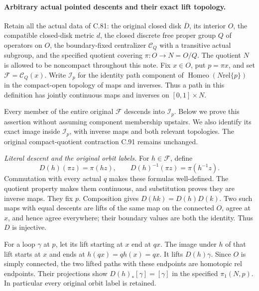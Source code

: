 \paragraph{Arbitrary actual pointed descents and their exact lift topology.}
Retain all the actual data of C.81: the original closed disk
$\overline D$, its interior $O$, the compatible closed-disk metric $d$,
the closed discrete free proper group $Q$ of operators on $O$,
the boundary-fixed centralizer $\mathscr C_Q$ with a transitive actual
subgroup, and the specified quotient covering $\pi:O\to N=O/Q$.
The quotient $N$ is allowed to be noncompact throughout this note.
Fix $x\in O$, put $p=\pi x$, and set $\mathscr F=\mathscr C_Q(x)$.
Write $\mathscr I_p$ for the identity path component of
$\operatorname{Homeo}(N\mathbin{\mathrm{rel}}\{p\})$ in the compact-open
topology of maps and inverses. Thus a path in this definition has
jointly continuous maps and inverses on $[0,1]\times N$.

Every member of the entire original $\mathscr F$ descends into
$\mathscr I_p$. Below we prove this assertion without assuming
component membership upstairs. We also identify its exact image
inside $\mathscr I_p$, with inverse maps and both relevant topologies.
The original compact-quotient contraction C.91 remains unchanged.

\emph{Literal descent and the original orbit labels.}
For $h\in\mathscr F$, define
\[
 D(h)(\pi z)=\pi(hz),\qquad
 D(h)^{-1}(\pi z)=\pi(h^{-1}z).
                                                               \tag{GPD.1}
\]
Commutation with every actual $q$ makes these formulas well-defined.
The quotient property makes them continuous, and substitution proves
they are inverse maps. They fix $p$. Composition gives
$D(hk)=D(h)D(k)$. Two such maps with equal descents are lifts of the
same map on the connected $O$, agree at $x$, and hence agree everywhere;
their boundary values are both the identity. Thus $D$ is injective.

For a loop $\gamma$ at $p$, let its lift starting at $x$ end at $qx$.
The image under $h$ of that lift starts at $x$ and ends at
$h(qx)=qh(x)=qx$. It lifts $D(h)\gamma$.
Since $O$ is simply connected, the two lifted paths with these
endpoints are homotopic rel endpoints. Their projections show
$D(h)_*[\gamma]=[\gamma]$ in the specified $\pi_1(N,p)$.
In particular every original orbit label is retained.

